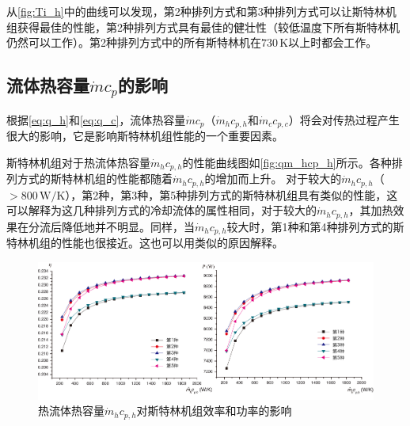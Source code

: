 从\autoref{fig:Ti_h}中的曲线可以发现，第2种排列方式和第3种排列方式可以让斯特林机组获得最佳的性能，第2种排列方式具有最佳的健壮性（较低温度下所有斯特林机仍然可以工作）。第2种排列方式中的所有斯特林机在$730\,\mathrm{K}$以上时都会工作。

\subsection{流体热容量$\dot{m}c_p$的影响}

根据\autoref{eq:q_h}和\autoref{eq:q_c}，流体热容量$\dot{m}c_p$（$\dot{m}_hc_{p,h}$和$\dot{m}_cc_{p,c}$）将会对传热过程产生很大的影响，它是影响斯特林机组性能的一个重要因素。

斯特林机组对于热流体热容量$\dot{m}_hc_{p,h}$的性能曲线图如\autoref{fig:qm_hcp_h}所示。各种排列方式的斯特林机组的性能都随着$\dot{m}_hc_{p,h}$的增加而上升。
对于较大的$\dot{m}_hc_{p,h}$（$> 800\,\mathrm{W/K}$），第2种，第3种，第5种排列方式的斯特林机组具有类似的性能，这可以解释为这几种排列方式的冷却流体的属性相同，对于较大的$\dot{m}_hc_{p,h}$，其加热效果在分流后降低地并不明显。同样，当$\dot{m}_hc_{p,h}$较大时，第1种和第4种排列方式的斯特林机组的性能也很接近。这也可以用类似的原因解释。

\begin{figure}[htbp]
\centering
	\includegraphics[width = 0.95\columnwidth]{fig/qm_hcp_h}
	\caption{热流体热容量$\dot{m}_hc_{p,h}$对斯特林机组效率和功率的影响}
	\label{fig:qm_hcp_h}
\end{figure}

